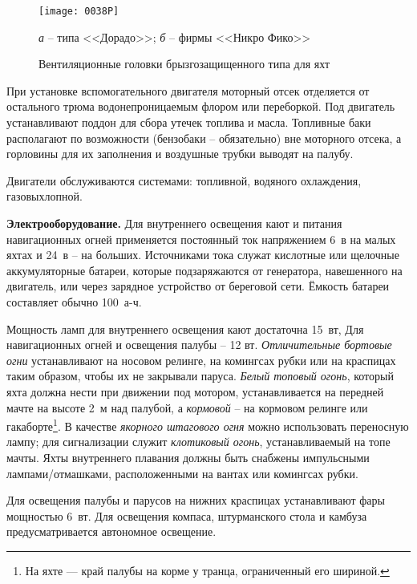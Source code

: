 \begin{figure}[htb]
  \centering
  \texttt{[image: 0038P]}
  \caption{Вентиляционные головки брызгозащищенного типа для яхт}
  \label{fig:38}
  \small
  \centering{}
  \textit{а} \--- типа <<Дорадо>>; \textit{б} \--- фирмы <<Никро Фико>>
\end{figure}

При установке вспомогательного двигателя моторный отсек отделяется от
остального трюма водонепроницаемым флором или переборкой. Под
двигатель устанавливают поддон для сбора утечек топлива и
масла. Топливные баки располагают по возможности (бензобаки \---
обязательно) вне моторного отсека, а горловины для их заполнения и
воздушные трубки выводят на палубу.

Двигатели обслуживаются системами: топливной, водяного охлаждения,
газовыхлопной.

\textbf{Электрооборудование.} Для
внутреннего освещения кают и питания навигационных огней применяется
постоянный ток напряжением 6~в на малых яхтах и 24~в \--- на
больших. Источниками тока служат кислотные или щелочные аккумуляторные
батареи, которые подзаряжаются от генератора, навешенного на
двигатель, или через зарядное устройство от береговой сети. Ёмкость
батареи составляет обычно 100~а-ч.

Мощность ламп для внутреннего освещения кают достаточна 15~вт,
Для навигационных огней и освещения палубы \--- 12
вт. \textit{Отличительные бортовые огни}
устанавливают на носовом релинге, на комингсах рубки или на краспицах
таким образом, чтобы их не закрывали паруса. \textit{Белый
топовый огонь}, который яхта должна нести
при движении под мотором, устанавливается на передней мачте на высоте
2~м над палубой, а \textit{кормовой} \--- на
кормовом релинге или гакаборте\footnote{На яхте --- край палубы на
  корме у транца, ограниченный его шириной.}. В качестве \textit{якорного
штагового огня} можно
использовать переносную лампу; для сигнализации служит \textit{клотиковый
огонь}, устанавливаемый на топе мачты. Яхты
внутреннего плавания должны быть снабжены импульсными
лампами\-/отмашками, расположенными на вантах или комингсах рубки.

Для освещения палубы и парусов на нижних краспицах устанавливают фары
мощностью 6~вт. Для освещения компаса, штурманского стола и
камбуза предусматривается автономное освещение.


